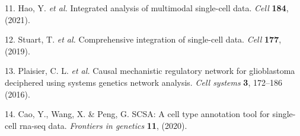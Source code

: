 \documentclass[
]{article}
\newenvironment{cslreferences}%
  {}%
  {\par}
\begin{document}
\begin{cslreferences}
\leavevmode\hypertarget{ref-IntegratedAnalHaoY2021}{}%
11. Hao, Y. \emph{et al.} Integrated analysis of multimodal single-cell data. \emph{Cell} \textbf{184}, (2021).

\leavevmode\hypertarget{ref-ComprehensiveIStuart2019}{}%
12. Stuart, T. \emph{et al.} Comprehensive integration of single-cell data. \emph{Cell} \textbf{177}, (2019).

\leavevmode\hypertarget{ref-CausalMechanisPlaisi2016}{}%
13. Plaisier, C. L. \emph{et al.} Causal mechanistic regulatory network for glioblastoma deciphered using systems genetics network analysis. \emph{Cell systems} \textbf{3}, 172--186 (2016).

\leavevmode\hypertarget{ref-ScsaACellTyCaoY2020}{}%
14. Cao, Y., Wang, X. \& Peng, G. SCSA: A cell type annotation tool for single-cell rna-seq data. \emph{Frontiers in genetics} \textbf{11}, (2020).
\end{cslreferences}
\end{document}

